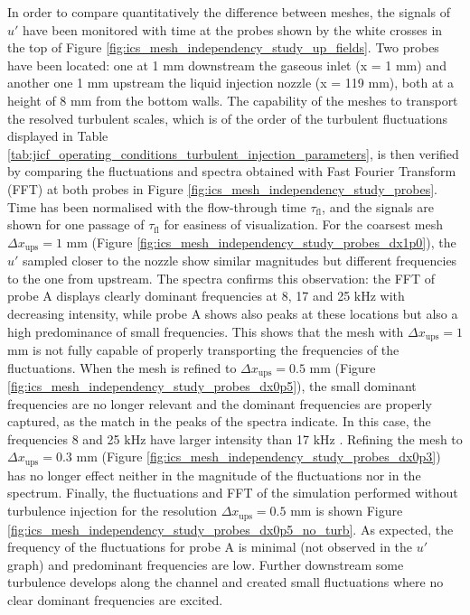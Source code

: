 In order to compare quantitatively the difference between meshes, the signals of $u'$ have been monitored with time at the probes shown by the white crosses in the top of Figure \ref{fig:ics_mesh_independency_study_up_fields}. Two probes have been located: one at 1 mm downstream the gaseous inlet (x = 1 mm) and another one 1 mm upstream the liquid injection nozzle (x = 119 mm), both at a height of 8 mm from the bottom walls. The capability of the meshes to transport the resolved turbulent scales, which is of the order of the turbulent fluctuations displayed in Table \ref{tab:jicf_operating_conditions_turbulent_injection_parameters}, is then verified by comparing the fluctuations and spectra obtained with Fast Fourier Transform (FFT) at both probes in Figure \ref{fig:ics_mesh_independency_study_probes}. Time has been normalised with the flow-through time $\tau_\mathrm{fl}$, and the signals are shown for one passage of $\tau_\mathrm{fl}$ for easiness of visualization. For the coarsest mesh $\Delta x_\mathrm{ups} = 1$ mm (Figure \ref{fig:ics_mesh_independency_study_probes_dx1p0}), the $u'$ sampled closer to the nozzle show similar magnitudes but different frequencies to the one from upstream. The spectra confirms this observation: the FFT of probe A displays clearly dominant frequencies at 8, 17 and 25 $\mathrm{kHz}$ with decreasing intensity, while probe A shows also peaks at these locations but also a high predominance of small frequencies. This shows that the mesh with $\Delta x_\mathrm{ups} = 1$ mm is not fully capable of properly transporting the frequencies of the fluctuations. When the mesh is refined to $\Delta x_\mathrm{ups} = 0.5$ mm (Figure \ref{fig:ics_mesh_independency_study_probes_dx0p5}), the small dominant frequencies are no longer relevant and the dominant frequencies are properly captured, as the match in the peaks of the spectra indicate. In this case, the frequencies 8 and 25 $\mathrm{kHz}$ have larger intensity than 17 $\mathrm{kHz}$ . Refining the mesh to $\Delta x_\mathrm{ups} = 0.3$ mm (Figure \ref{fig:ics_mesh_independency_study_probes_dx0p3}) has no longer effect neither in the magnitude of the fluctuations nor in the spectrum. Finally, the fluctuations and FFT of the simulation performed without turbulence injection for the resolution $\Delta x_\mathrm{ups} = 0.5$ mm is shown Figure \ref{fig:ics_mesh_independency_study_probes_dx0p5_no_turb}. As expected, the frequency of the fluctuations  for probe A is minimal (not observed in the $u'$ graph) and predominant frequencies are low. Further downstream some turbulence develops along the channel and created small fluctuations where no clear dominant frequencies are excited. 


